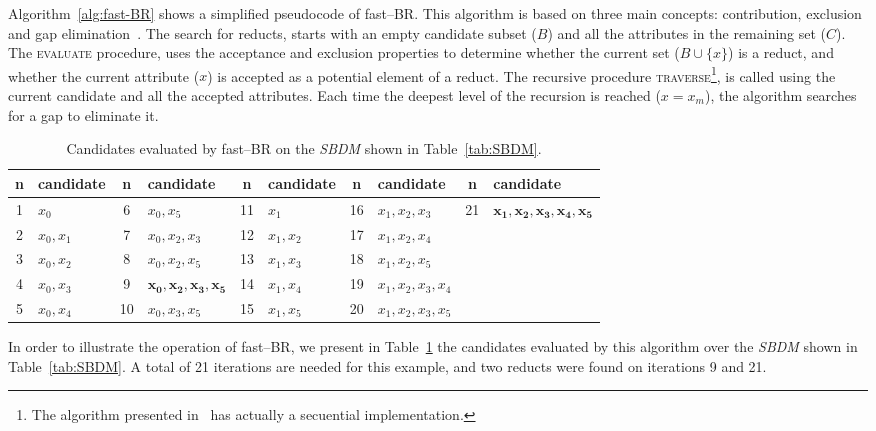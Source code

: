 \documentclass[citenumber]{elsarticle}
\begin{document}
 Algorithm~\ref{alg:fast-BR} shows a simplified pseudocode of fast--BR. This algorithm is based on three main concepts: contribution, exclusion and gap elimination~\cite{Lias13}. The search for reducts, starts with an empty candidate subset ($B$) and all the attributes in the remaining set ($C$). The \textsc{evaluate} procedure, uses the acceptance and exclusion properties to determine whether the current set ($B\cup \lbrace x\rbrace$) is a reduct, and whether the current attribute ($x$) is accepted as a potential element of a reduct. The recursive procedure \textsc{traverse}\footnote{The algorithm presented in~\cite{Lias13} has actually a secuential implementation.}, is called using the current candidate and all the accepted attributes. Each time the deepest level of the recursion is reached ($x=x_m$), the algorithm searches for a gap to eliminate it.
 
 \begin{table}[htb]
 		\caption{Candidates evaluated by fast--BR on the \textit{SBDM} shown in Table~\ref{tab:SBDM}.} \label{tab:cand}
 		\small
 		\centering
 		\setlength{\tabcolsep}{3pt}
 	 	\begin{tabular}{cl|cl|cl|cl|cl}
 	 		n & candidate & n & candidate & n & candidate & n & candidate & n & candidate \\
 	 		\hline
			1 & ${x_0}$     & 6  & ${x_0,x_5}$         & 11 & ${x_1}$     & 16 & ${x_1,x_2,x_3}$     & 21 & $\mathbf{{x_1,x_2,x_3,x_4,x_5}}$  \\
			2 & ${x_0,x_1}$ & 7  & ${x_0,x_2,x_3}$     & 12 & ${x_1,x_2}$ & 17 & ${x_1,x_2,x_4}$     &   \\
			3 & ${x_0,x_2}$ & 8  & ${x_0,x_2,x_5}$     & 13 & ${x_1,x_3}$ & 18 & ${x_1,x_2,x_5}$     &   \\
			4 & ${x_0,x_3}$ & 9  & $\mathbf{{x_0,x_2,x_3,x_5}}$ & 14 & ${x_1,x_4}$ & 19 & ${x_1,x_2,x_3,x_4}$ &   \\
			5 & ${x_0,x_4}$ & 10 & ${x_0,x_3,x_5}$     & 15 & ${x_1,x_5}$ & 20 & ${x_1,x_2,x_3,x_5}$ &       
 	 	\end{tabular}             
  	\end{table}	
 	
 	In order to illustrate the operation of fast--BR, we present in Table~\ref{tab:cand} the candidates evaluated by this algorithm over the \textit{SBDM} shown in Table~\ref{tab:SBDM}. A total of 21 iterations are needed for this example, and two reducts were found on iterations 9 and 21. 
 	
\end{document}
